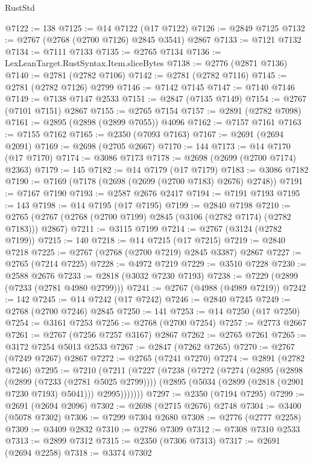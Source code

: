 \begin{lexlean}{RustStd}
\begin{coremodule}
@7122 := 138
@7125 := @14 @7122 (@17 @7122)
@7126 := @2849 @7125
@7132 := @2767 (@2768 (@2700 @7126) @2845 @3541) @2867
@7133 := @7121 @7132
@7134 := @7111 @7133
@7135 := @2765 @7134
@7136 := LexLeanTarget.RustSyntax.Item.sliceBytes
@7138 := @2776 (@2871 @7136)
@7140 := @2781 (@2782 @7106)
@7142 := @2781 (@2782 @7116)
@7145 := @2781 (@2782 @7126) @2799
@7146 := @7142 @7145
@7147 := @7140 @7146
@7149 := @7138 @7147 @2533
@7151 := @2847 (@7135 @7149)
@7154 := @2767 (@7101 @7151) @2867
@7155 := @2765 @7154
@7157 := @2891 (@2782 @7098)
@7161 := @2895 (@2898 (@2899 @7055)) @4096
@7162 := @7157 @7161
@7163 := @7155 @7162
@7165 := @2350 (@7093 @7163)
@7167 := @2691 (@2694 @2091)
@7169 := @2698 (@2705 @2667)
@7170 := 144
@7173 := @14 @7170 (@17 @7170)
@7174 := @3086 @7173
@7178 := @2698 (@2699 (@2700 @7174) @2363)
@7179 := 145
@7182 := @14 @7179 (@17 @7179)
@7183 := @3086 @7182
@7190 := @7169 (@7178 (@2698 (@2699 (@2700 @7183) @2676) @2748))
@7191 := @7167 @7190
@7193 := @2587 @2676 @2417
@7194 := @7191 @7193
@7195 := 143
@7198 := @14 @7195 (@17 @7195)
@7199 := @2840 @7198
@7210 := @2765 (@2767 (@2768 (@2700 @7199) @2845 (@3106 (@2782 @7174) (@2782 @7183))) @2867)
@7211 := @3115 @7199
@7214 := @2767 (@3124 (@2782 @7199))
@7215 := 140
@7218 := @14 @7215 (@17 @7215)
@7219 := @2840 @7218
@7225 := @2767 (@2768 (@2700 @7219) @2845 @3387) @2867
@7227 := @2765 (@7214 @7225)
@7228 := @4972 @7219
@7229 := @3510 @7228
@7230 := @2588 @2676
@7233 := @2818 (@3032 @7230 @7193)
@7238 := @7229 (@2899 (@7233 (@2781 @4980 @2799)))
@7241 := @2767 (@4988 (@4989 @7219))
@7242 := 142
@7245 := @14 @7242 (@17 @7242)
@7246 := @2840 @7245
@7249 := @2768 (@2700 @7246) @2845
@7250 := 141
@7253 := @14 @7250 (@17 @7250)
@7254 := @3161 @7253
@7256 := @2768 (@2700 @7254)
@7257 := @2773 @2667
@7261 := @2767 (@7256 @7257 @3167) @2867
@7262 := @2765 @7261
@7265 := @3172 @7254 @5013 @2533
@7267 := @2847 (@7262 @7265)
@7270 := @2767 (@7249 @7267) @2867
@7272 := @2765 (@7241 @7270)
@7274 := @2891 (@2782 @7246)
@7295 := @7210
    (@7211
      (@7227
        (@7238
          (@7272
            (@7274
              (@2895
                (@2898 (@2899 (@7233 (@2781 @5025 @2799))))
                (@2895 (@5034 (@2899 (@2818 (@2901 @7230 @7193) @5041))) @2995)))))))
@7297 := @2350 (@7194 @7295)
@7299 := @2691 (@2694 @2096)
@7302 := @2698 (@2715 @2676) @2748
@7304 := @3400 (@5078 @7302)
@7306 := @7299 @7304 @2680
@7308 := @2776 (@2777 @2258)
@7309 := @3409 @2832
@7310 := @2786 @7309
@7312 := @7308 @7310 @2533
@7313 := @2899 @7312
@7315 := @2350 (@7306 @7313)
@7317 := @2691 (@2694 @2258)
@7318 := @3374 @7302

\end{coremodule}
\end{lexlean}
